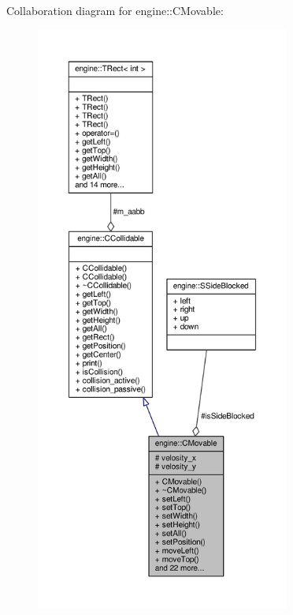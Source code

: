 Collaboration diagram for engine\-:\-:C\-Movable\-:
\nopagebreak
\begin{figure}[H]
\begin{center}
\leavevmode
\includegraphics[height=550pt]{classengine_1_1CMovable__coll__graph}
\end{center}
\end{figure}
